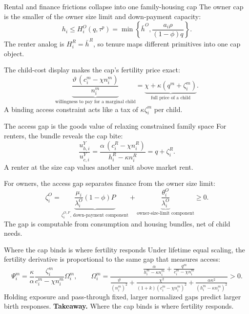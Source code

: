 \documentclass[aspectratio=169,10pt]{beamer}
\newcommand{\takeaway}[1]{\vfill{\footnotesize\textbf{Takeaway.} #1}}
\begin{document}
\begin{frame}{Rental and finance frictions collapse into one family-housing cap}
  The owner cap is the smaller of the owner size limit and down-payment capacity:
  \[
  h_i\le
  H_i^O(q,\tau^p)
  =
  \min\left\{
  \bar h^O,
  \frac{a_i\rho}{(1-\phi)q}
  \right\}.
  \]
  The renter analog is $H_i^R=\bar h^R$, so tenure maps different primitives into one cap object.

  The child-cost display makes the cap's fertility price exact:
  \[
  \underbrace{\frac{\vartheta\,(c_i^m-\chi n_i^m)}{n_i^m}}_{\text{willingness to pay for a marginal child}}
  =
  \underbrace{\chi+\kappa(q^m+\zeta_i^m)}_{\text{full price of a child}} .
  \]
  A binding access constraint acts like a tax of $\kappa\zeta_i^m$ per child.
\end{frame}

\begin{frame}{The access gap is the goods value of relaxing constrained family space}
  For renters, the bundle reveals the cap bite:
  \[
  \frac{u^Y_{h,i}}{u^Y_{c,i}}
  =
  \frac{\alpha\,(c_i^R-\chi n_i^R)}{h_i^R-\kappa n_i^R}
  =
  q+\zeta_i^R.
  \]
  A renter at the size cap values another unit above market rent.

  For owners, the access gap separates finance from the owner size limit:
  \[
  \zeta_i^O
  =
  \underbrace{\frac{\mu_i}{\lambda_i^O}(1-\phi)P}_{\zeta_i^{O,F}\text{, down-payment component}}
  +
  \underbrace{\frac{\theta_i^O}{\lambda_i^O}}_{\text{owner-size-limit component}}
  \ge0.
  \]
  The gap is computable from consumption and housing bundles, net of child needs.
\end{frame}

\begin{frame}{Where the cap binds is where fertility responds}
  Under lifetime equal scaling, the fertility derivative is proportional to the same gap that measures access:
  \[
  \Psi_i^m
  =
  \frac{\kappa}{\alpha}
  \frac{\zeta_i^m}{c_i^m-\chi n_i^m}
  \Omega_i^m,
  \qquad
  \Omega_i^m
  =
  \frac{
  \frac{\alpha}{h_i^m-\kappa n_i^m}+\frac{q^m}{c_i^m-\chi n_i^m}
  }{
  \frac{\vartheta}{(n_i^m)^2}
  +
  \frac{\chi^2}{(1+k)(c_i^m-\chi n_i^m)^2}
  +
  \frac{\alpha\kappa^2}{(h_i^m-\kappa n_i^m)^2}
  }
  >0.
  \]
  Holding exposure and pass-through fixed, larger normalized gaps predict larger birth responses.
  \takeaway{Where the cap binds is where fertility responds.}
\end{frame}
\end{document}

